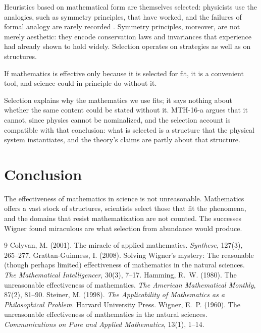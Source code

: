 \documentclass{situationist-preprint}
\begin{document}
\begin{reply}
Heuristics based on mathematical form are themselves selected: physicists use the analogies, such as symmetry principles, that have worked, and the failures of formal analogy are rarely recorded \citep{Colyvan2001}. Symmetry principles, moreover, are not merely aesthetic: they encode conservation laws and invariances that experience had already shown to hold widely. Selection operates on strategies as well as on structures.
\end{reply}

\begin{objection}[Dispensability]
If mathematics is effective only because it is selected for fit, it is a convenient tool, and science could in principle do without it.
\end{objection}

\begin{reply}
Selection explains why the mathematics we use fits; it says nothing about whether the same content could be stated without it. MTH-16-a argues that it cannot, since physics cannot be nominalized, and the selection account is compatible with that conclusion: what is selected is a structure that the physical system instantiates, and the theory's claims are partly about that structure.
\end{reply}

\section{Conclusion}

The effectiveness of mathematics in science is not unreasonable. Mathematics offers a vast stock of structures, scientists select those that fit the phenomena, and the domains that resist mathematization are not counted. The successes Wigner found miraculous are what selection from abundance would produce.

\begin{thebibliography}{9}\small
{} Colyvan, M. (2001). The miracle of applied mathematics. \emph{Synthese}, 127(3), 265--277.
 Grattan-Guinness, I. (2008). Solving Wigner's mystery: The reasonable (though perhaps limited) effectiveness of mathematics in the natural sciences. \emph{The Mathematical Intelligencer}, 30(3), 7--17.
 Hamming, R.~W. (1980). The unreasonable effectiveness of mathematics. \emph{The American Mathematical Monthly}, 87(2), 81--90.
 Steiner, M. (1998). \emph{The Applicability of Mathematics as a Philosophical Problem}. Harvard University Press.
 Wigner, E.~P. (1960). The unreasonable effectiveness of mathematics in the natural sciences. \emph{Communications on Pure and Applied Mathematics}, 13(1), 1--14.
\end{thebibliography}
\end{document}
